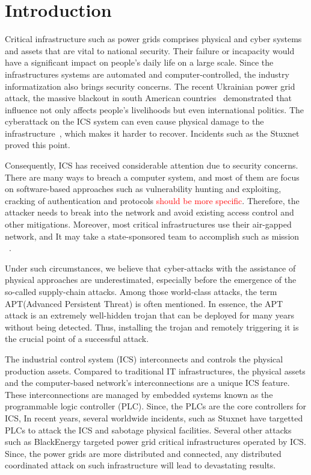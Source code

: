 \section{Introduction}
\label{sec:implant-introduction}

Critical infrastructure such as power grids comprises physical and cyber systems and assets that are vital to national security. Their failure or incapacity would have a significant impact on people's daily life on a large scale. Since the infrastructures systems are automated and computer-controlled, the industry informatization also brings security concerns. The recent Ukrainian power grid attack, the massive blackout in south American countries~\cite{haes2019survey} demonstrated that influence not only affects people's livelihoods but even international politics. The cyberattack on the ICS system can even cause physical damage to the infrastructure~\cite{zeller2011myth}, which makes it harder to recover. Incidents such as the Stuxnet proved this point. 

Consequently, ICS has received considerable attention due to security concerns. There are many ways to breach a computer system, and most of them are focus on software-based approaches such as vulnerability hunting and exploiting, cracking of authentication and protocols \textcolor{red}{should be more specific}. Therefore, the attacker needs to break into the network and avoid existing access control and other mitigations. Moreover, most critical infrastructures use their air-gapped network, and It may take a state-sponsored team to accomplish such as mission ~\cite{langner2011stuxnet}. 

Under such circumstances, we believe that cyber-attacks with the assistance of physical approaches are underestimated, especially before the emergence of the so-called supply-chain attacks. Among those world-class attacks, the term APT(Advanced Persistent Threat) is often mentioned. In essence, the APT attack is an extremely well-hidden trojan that can be deployed for many years without being detected. Thus, installing the trojan and remotely triggering it is the crucial point of a successful attack.

The industrial control system (ICS) interconnects and controls the physical production assets. Compared to traditional IT infrastructures, the physical assets and the computer-based network's interconnections are a unique ICS feature. These interconnections are managed by embedded systems known as the programmable logic controller (PLC). Since, the PLCs are the core controllers for ICS, In recent years, several worldwide incidents, such as Stuxnet \cite{langner2011stuxnet} have targetted PLCs to attack the ICS and sabotage physical facilities. Several other attacks such as BlackEnergy \cite{cherepanov2016blackenergy, case2016analysis, soltan2016power, zhang2013time, williams2016power} targeted power grid critical infrastructures operated by ICS. Since, the power grids are more distributed and connected, any distributed coordinated attack on such infrastructure will lead to devastating results.

